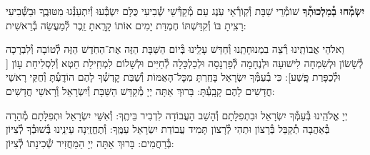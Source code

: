 \documentclass[twoside, openany, parskip=half, 11pt]{book}
\begin{document}
\begin{sometimes}
\textbf{יִשְׂמְ֯חוּ בְ֯מַלְכוּתְ֯ךָ}
שׁוֹמְ֯רֵי שַׁבָּת וְ֯קֽוֹרְ֯אֵי עֹֽנֶג עַם מְ֯קַדְּ֯שֵׁי שְׁ֯בִיעִי כֻּלָּם יִשְׂבְּ֯עוּ וְ֯יִתְעַנְּ֯גוּ מִטּוּבֶֽךָ וּבַשְּׁ֯בִיעִי רָצִֽיתָ בּוֹ וְ֯קִדַּשְׁתּוֹ חֶמְדַּת יָמִים אוֹתוֹ קָרָֽאתָ זֵֽכֶר לְ֯מַעֲשֵׂה בְ֯רֵאשִׁית:

 וֵאלֹהֵי אֲבוֹתֵֽינוּ רְ֯צֵה בִמְנוּחָתֵֽנוּ וְ֯חַדֵּשׁ עָלֵֽינוּ בְּ֯יוֹם הַשַּׁבָּת הַזֶּה אֶת־הַחֹֽדֶשׁ הַזֶּה לְ֯טוֹבָה וְ֯לִבְרָכָה לְ֯שָׂשׂוֹן וּלְשִׂמְחָה לִישׁוּעָה וּלְנֶחָמָה לְ֯פַרְנָסָה וּלְכַלְכָּלָה לְ֯חַיִּים וּלְשָׁלוֹם לִמְחִֽילַת חֵטְא וְ֯לִסְלִיחַת עָוֹן [
וּלְ֯כַפָּרַת פָּֽשַׁע]: כִּי בְ֯עַמְּ֯ךָ יִשְׂרָאֵל בָּחַֽרְתָּ מִכׇּל־הָאֻמּוֹת וְ֯שַׁבַּת קׇדְשְׁ֯ךָ לָהֶם הוֹדָֽעְ֯תָּ וְ֯חֻקֵּי רָאשֵׁי חֳדָשִׁים לָהֶם קָבָֽעְ֯תָּ: בָּרוּךְ אַתָּה יְיָ מְ֯קַדֵּשׁ הַשַּׁבָּת וְ֯יִשְׂרָאֵל וְ֯רָאשֵׁי חֳדָשִׁים: 

\end{sometimes}

יְיָ אֱלֹהֵֽינוּ בְּ֯עַמְּ֯ךָ יִשְׂרָאֵל וּבִתְפִלָּתָם וְ֯הָשֵׁב הָעֲבוֹדָה לִדְבִיר בֵּיתֶֽךָ: וְ֯אִשֵּׁי יִשְׂרָאֵל וּתְפִלָּתָם מְ֯הֵרָה בְּ֯אַהֲבָה תְ֯קַבֵּל בְּ֯רָצוֹן וּתְהִי לְ֯רָצוֹן תָּמִיד עֲבוֹדַת יִשְׂרָאֵל עַמֶּֽךָ: וְ֯תֶחֱזֶֽינָה עֵינֵֽינוּ בְּ֯שׁוּבְ֯ךָ לְ֯צִיּוֹן בְּ֯רַחֲמִים:
בָּרוּךְ אַתָּה יְיָ הַמַּחֲזִיר שְׁ֯כִינָתוֹ לְ֯צִיּוֹן:

\modim

\nextpage

\shabboschanukah

\shabboshodos

\vspace{.5\baselineskip}
\end{document}
